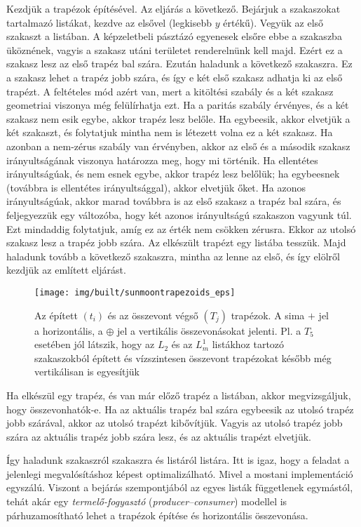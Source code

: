 \documentclass[12pt]{report}
\theoremstyle{definition}
\newcommand{\inenglish}[1]{\textsl{#1}}
\begin{document}
Kezdjük a trapézok építésével. Az eljárás a következő. Bejárjuk a szakaszokat
tartalmazó listákat, kezdve az elsővel (legkisebb $y$ értékű). Vegyük az első
szakaszt a listában. A képzeletbeli pásztázó egyenesek elsőre ebbe a szakaszba
üköznének, vagyis a szakasz utáni területet renderelnünk kell majd. Ezért ez a
szakasz lesz az első trapéz bal szára. Ezután haladunk a következő szakaszra.
Ez a szakasz lehet a trapéz jobb szára, és így e két első szakasz adhatja ki az
első trapézt. A feltételes mód azért van, mert a kitöltési szabály és a két
szakasz geometriai viszonya még felülírhatja ezt. Ha a paritás szabály
érvényes, és a két szakasz nem esik egybe, akkor trapéz lesz belőle. Ha
egybeesik, akkor elvetjük a két szakaszt, és folytatjuk mintha nem is létezett
volna ez a két szakasz. Ha azonban a nem-zérus szabály van érvényben, akkor az
első és a második szakasz irányultságának viszonya határozza meg, hogy mi
történik. Ha ellentétes irányultságúak, és nem esnek egybe, akkor trapéz lesz
belőlük; ha egybeesnek (továbbra is ellentétes irányultsággal), akkor elvetjük
őket. Ha azonos irányultságúak, akkor marad továbbra is az első szakasz a
trapéz bal szára, és feljegyezzük egy változóba, hogy két azonos irányultságú
szakaszon vagyunk túl. Ezt mindaddig folytatjuk, amíg ez az érték nem csökken
zérusra. Ekkor az utolsó szakasz lesz a trapéz jobb szára. Az elkészült trapézt
egy listába tesszük. Majd haladunk tovább a következő szakaszra, mintha az
lenne az első, és így elölről kezdjük az említett eljárást.

  \begin{figure}
    \centering \texttt{[image: img/built/sunmoontrapezoids\_eps]}
    \caption{\label{fig:sunmoontrapezoids} Az épített $(t_i)$ és az összevont végső
    $(T_j)$ trapézok. A sima $+$ jel a horizontális, a $\oplus$ jel a
    vertikális összevonásokat jelenti. Pl. a $T_5$ esetében jól látszik, hogy
    az $L_2$ és az $L_m^1$ listákhoz tartozó szakaszokból épített és
    vízszintesen összevont trapézokat később még vertikálisan is egyesítjük}
  \end{figure}

Ha elkészül egy trapéz, és van már előző trapéz a listában, akkor
megvizsgáljuk, hogy összevonhatók-e. Ha az aktuális trapéz bal szára egybeesik
az utolsó trapéz jobb szárával, akkor az utolsó trapézt kibővítjük. Vagyis az
utolsó trapéz jobb szára az aktuális trapéz jobb szára lesz, és az aktuális
trapézt elvetjük.

Így haladunk szakaszról szakaszra és listáról listára. Itt is igaz, hogy a
feladat a jelenlegi megvalósításhoz képest optimalizálható. Mivel a mostani
implementáció egyszálú. Viszont a bejárás szempontjából az egyes listák
függetlenek egymástól, tehát akár egy \emph{termelő-fogyasztó}
(\inenglish{producer--consumer}) modellel is párhuzamosítható lehet a trapézok
építése és horizontális összevonása.
\end{document}
